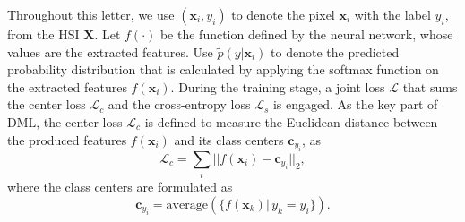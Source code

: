 \documentclass[]{article}
\newcommand{\red}{\color{black}}
\newcommand{\magentaso}{\color{black}}
\begin{document}
Throughout this letter, we use $(\mathbf{x}_i,y_i)$ to denote 
the pixel $\mathbf{x}_i$ with the label $y_i$, from the HSI $\mathbf{X}$.
Let $f(\cdot)$ be the function defined by the neural network, {\magentaso whose values are} the extracted features.
Use $\tilde{p}(y|\mathbf{x}_i)$ to denote the {\magentaso predicted} probability distribution 
{\magentaso that is calculated} by applying the softmax function
on the extracted features $f(\mathbf{x}_i)$.
During the training stage, a joint loss $\mathcal{L}$ that sums the center loss $\mathcal{L}_c$
and the cross-entropy loss $\mathcal{L}_s$ is engaged.
{\red As the key part of DML}, the center loss $\mathcal{L}_c$ is defined to measure the Euclidean distance between the
produced features $f(\mathbf{x}_i)$ and its class centers
$\mathbf{c}_{y_i}$, as
\begin{equation} \label{euclidean_dml}
	\mathcal{L}_c = \sum_i || f(\mathbf{x}_i) - \mathbf{c}_{y_i} ||_2,
\end{equation}
where the class centers are formulated as
\[
 \mathbf{c}_{y_i} = \mathrm{average}(\{f(\mathbf{x}_k)|\,y_k = y_i\}).
\]
\end{document}
